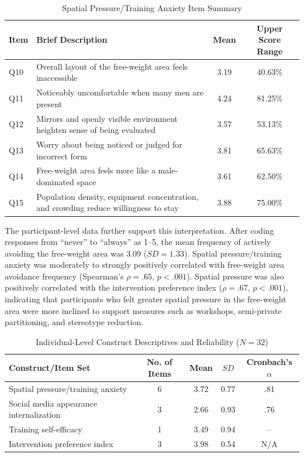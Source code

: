 \begin{table}[H]
\centering
\small
\caption{Spatial Pressure/Training Anxiety Item Summary}
\label{tab:spatial_items_actual}
\begin{tabularx}{\textwidth}{lXcc}
\toprule
Item & Brief Description & Mean & Upper Score Range \\
\midrule
Q10 & Overall layout of the free-weight area feels inaccessible & 3.19 & 40.63\% \\
Q11 & Noticeably uncomfortable when many men are present & 4.24 & 81.25\% \\
Q12 & Mirrors and openly visible environment heighten sense of being evaluated & 3.57 & 53.13\% \\
Q13 & Worry about being noticed or judged for incorrect form & 3.81 & 65.63\% \\
Q14 & Free-weight area feels more like a male-dominated space & 3.61 & 62.50\% \\
Q15 & Population density, equipment concentration, and crowding reduce willingness to stay & 3.88 & 75.00\% \\
\bottomrule
\end{tabularx}
\end{table}

The participant-level data further support this interpretation.
After coding responses from ``never'' to ``always'' as 1--5, the mean frequency of actively avoiding the free-weight area was 3.09 ($SD = 1.33$).
Spatial pressure/training anxiety was moderately to strongly positively correlated with free-weight area avoidance frequency (Spearman's $\rho = .65$, $p < .001$).
Spatial pressure was also positively correlated with the intervention preference index ($\rho = .67$, $p < .001$), indicating that participants who felt greater spatial pressure in the free-weight area were more inclined to support measures such as workshops, semi-private partitioning, and stereotype reduction.

\begin{table}[H]
\centering
\small
\caption{Individual-Level Construct Descriptives and Reliability ($N = 32$)}
\label{tab:participant_scales}
\begin{tabular}{lcccc}
\toprule
Construct/Item Set & No. of Items & Mean & $SD$ & Cronbach's $\alpha$ \\
\midrule
Spatial pressure/training anxiety & 6 & 3.72 & 0.77 & .81 \\
Social media appearance internalization & 3 & 2.66 & 0.93 & .76 \\
Training self-efficacy & 1 & 3.49 & 0.94 & -- \\
Intervention preference index & 3 & 3.98 & 0.54 & N/A \\
\bottomrule
\end{tabular}
\end{table}

